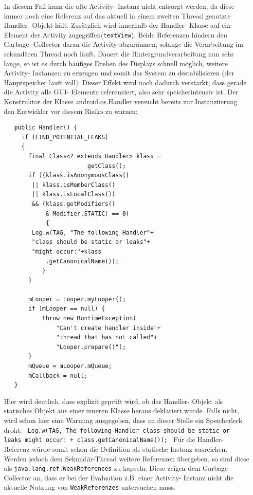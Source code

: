 \documentclass[12pt,oneside,a4paper,bibtotoc,liststotoc]{scrreprt}
\begin{document}
In diesem Fall kann die alte Activity- Instanz nicht entsorgt werden, da diese immer noch eine Referenz auf das aktuell in einem zweiten Thread genutzte Handler- Objekt hält. Zusätzlich wird innerhalb der Handler- Klasse auf ein Element der Activity zugegriffen(\texttt{textView}). Beide Referenzen hindern den Garbage- Collector daran die Activity abzuräumen, solange die Verarbeitung im sekundären Thread noch läuft. Dauert die Hintergrundverarbeitung nun sehr lange, so ist es durch häufiges Drehen des Displays schnell möglich, weitere Activity- Instanzen zu erzeugen und somit das System zu destabilisieren (der Hauptspeicher läuft voll). Dieser Effekt wird noch dadurch verstärkt, dass gerade die Activity alle GUI- Elemente referenziert, also sehr speicherintensiv ist. Der Konstruktor der Klasse android.os.Handler versucht bereits zur Instanziierung den Entwickler vor diesem Risiko zu warnen:\newline
\begin{lstlisting}
   public Handler() {
     if (FIND_POTENTIAL_LEAKS) 
     { 
       final Class<? extends Handler> klass = 
       					getClass();
       if ((klass.isAnonymousClass() 
       	|| klass.isMemberClass()
       	|| klass.isLocalClass())
       	&& (klass.getModifiers()
       		& Modifier.STATIC) == 0) 
       		{
		Log.w(TAG, "The following Handler"+ 
		"class should be static or leaks"+
		"might occur:"+klass
			.getCanonicalName());
           }
       }

       mLooper = Looper.myLooper();
       if (mLooper == null) {
           throw new RuntimeException(
               "Can't create handler inside"+
               "thread that has not called"+ 
               "Looper.prepare()");
       }
       mQueue = mLooper.mQueue;
       mCallback = null;
   }
\end{lstlisting}
Hier wird deutlich, dass explizit geprüft wird, ob das Handler- Objekt als statisches Objekt aus einer inneren Klasse heraus deklariert wurde. Falls nicht, wird schon hier eine Warnung ausgegeben, dass an dieser Stelle ein Speicherleck droht:\newline
\texttt{\newline
Log.w(TAG, \grqq The following Handler class should be static or leaks might occur: \grqq +
               	class.getCanonicalName());\newline
}\newline
Für die Handler- Referenz würde somit schon die Definition als statische Instanz ausreichen. Werden jedoch dem Sekundär-Thread weitere Referenzen übergeben, so sind diese als \texttt{java.lang.ref.WeakReferences} zu kapseln. Diese zeigen dem Garbage- Collector an, dass er bei der Evaluation z.B. einer Activity- Instanz nicht die aktuelle Nutzung von \texttt{WeakReferenzes} untersuchen muss.
\end{document}
